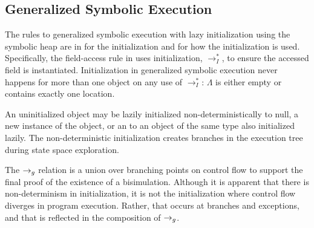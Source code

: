 \subsection{Generalized Symbolic Execution}
\label{app:gse}
The rules to generalized symbolic execution with
lazy initialization using the symbolic heap are in
 for the initialization and  for
how the initialization is used. Specifically, the field-access rule in
 uses initialization, $\rightarrow_I^*$, to ensure
the accessed field is instantiated. Initialization in generalized
symbolic execution never happens for more than one object on any use
of $\rightarrow_I^*$: $\Lambda$ is either empty or contains exactly
one location.

An uninitialized object may be lazily initialized
non-deterministically to null, a new instance of the object, or an to
an object of the same type also initialized lazily. The
non-deterministic initialization creates branches in the execution
tree during state space exploration. 

The $\rightarrow_{g}$ relation is a union over branching points on control flow
to support the final proof of the existence of a
bisimulation. Although it is apparent that there is non-determinism in
initialization, it is not the initialization where control flow
diverges in program execution. Rather, that occurs at branches and
exceptions, and that is reflected in the composition of $\rightarrow_{g}$.



